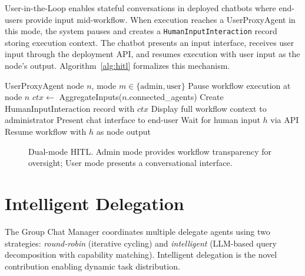 \documentclass[11pt]{article}
\begin{document}
User-in-the-Loop enables stateful conversations in deployed chatbots where end-users provide input mid-workflow. When execution reaches a UserProxyAgent in this mode, the system pauses and creates a \texttt{HumanInputInteraction} record storing execution context. The chatbot presents an input interface, receives user input through the deployment API, and resumes execution with user input as the node's output. Algorithm~\ref{alg:hitl} formalizes this mechanism.

\begin{algorithm}[t]
\caption{Human-in-the-Loop Pause/Resume}
\label{alg:hitl}
\begin{algorithmic}[1]
\REQUIRE UserProxyAgent node $n$, mode $m \in \{\text{admin}, \text{user}\}$
\STATE Pause workflow execution at node $n$
\STATE $ctx \leftarrow$ AggregateInputs($n$.connected\_agents)
\STATE Create HumanInputInteraction record with $ctx$
    \STATE Display full workflow context to administrator
\ELSE
    \STATE Present chat interface to end-user
\ENDIF
\STATE Wait for human input $h$ via API
\STATE Resume workflow with $h$ as node output
\end{algorithmic}
\end{algorithm}

\begin{figure}[t]
    \centering
    \caption{Dual-mode HITL. Admin mode provides workflow transparency for oversight; User mode presents a conversational interface.}
    \label{fig:hitl-modes}
\end{figure}


\section{Intelligent Delegation}
\label{sec:delegation}

The Group Chat Manager coordinates multiple delegate agents using two strategies: \textit{round-robin} (iterative cycling) and \textit{intelligent} (LLM-based query decomposition with capability matching). Intelligent delegation is the novel contribution enabling dynamic task distribution.
\end{document}
